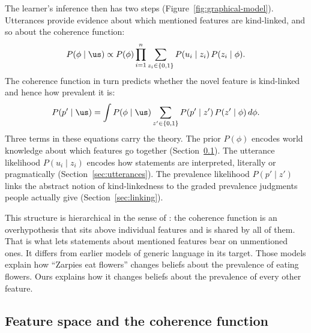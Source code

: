The learner's inference then has two steps (Figure~\ref{fig:graphical-model}).
Utterances provide evidence about which mentioned features are kind-linked, and
so about the coherence function:
\begin{equation}
    P(\phi \mid \us) \propto P(\phi) \prod_{i=1}^{n} \sum_{z_i \in \{0,1\}}
        P(u_i \mid z_i)\, P(z_i \mid \phi).
    \label{eq:phi-posterior}
\end{equation}
The coherence function in turn predicts whether the novel feature is kind-linked
and hence how prevalent it is:
\begin{equation}
    P(p' \mid \us) = \int P(\phi \mid \us) \sum_{z' \in \{0,1\}}
        P(p' \mid z')\, P(z' \mid \phi)\, d\phi.
    \label{eq:prevalence-predictive}
\end{equation}
Three terms in these equations carry the theory. The prior $P(\phi)$ encodes
world knowledge about which features go together (Section~\ref{sec:feature-space}).
The utterance likelihood $P(u_i \mid z_i)$ encodes how statements are
interpreted, literally or pragmatically (Section~\ref{sec:utterances}). The
prevalence likelihood $P(p' \mid z')$ links the abstract notion of
kind-linkedness to the graded prevalence judgments people actually give
(Section~\ref{sec:linking}).


This structure is hierarchical in the sense of \citet{kempetal2007learningoverhypotheses}:
the coherence function is an overhypothesis that sits above individual features
and is shared by all of them. That is what lets statements about mentioned
features bear on unmentioned ones. It differs from earlier models of generic
language \citep{tesslergoodman2019languagegeneralization} in its target. Those
models explain how ``Zarpies eat flowers'' changes beliefs about the prevalence
of eating flowers. Ours explains how it changes beliefs about the prevalence of
every other feature.

\subsection{Feature space and the coherence function}
\label{sec:feature-space}

